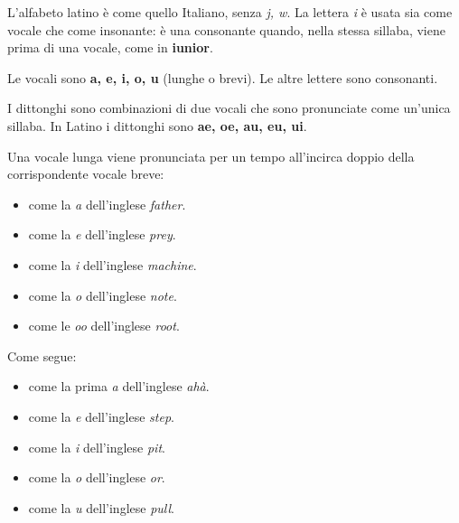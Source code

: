 \documentclass[nols]{tufte-handout}
\newcommand{\textls}[2][5]{%
    \begingroup\addfontfeatures{LetterSpace=#1}#2\endgroup
  }
\renewcommand{\smallcapsspacing}[1]{\textls[10]{#1}}
\renewcommand{\textsc}[1]{\smallcapsspacing{\textsmallcaps{#1}}}
\begin{document}
 L'alfabeto latino è come quello Italiano, senza \textit{j, w}. La lettera \textit{i} è usata sia come vocale che come insonante: è una consonante quando, nella stessa sillaba, viene prima di una vocale, come in \textbf{iunior}.

 Le vocali sono \textbf{a, e, i, o, u} (lunghe o brevi). Le altre lettere sono consonanti.

 I dittonghi sono combinazioni di due vocali che sono pronunciate come un'unica sillaba. In Latino i dittonghi sono \textbf{ae, oe, au, eu, ui}.

 Una vocale lunga viene pronunciata per un tempo all'incirca doppio della corrispondente vocale breve:
\begin{itemize}
\item[\textsc{ā}] come la \textit{a} dell'inglese \textit{father}.  
\item[\textsc{ē}] come la \textit{e} dell'inglese \textit{prey}. 
\item[\textsc{ī}] come la \textit{i} dell'inglese \textit{machine}.  
\item[\textsc{ō}] come la \textit{o} dell'inglese \textit{note}.  
\item[\textsc{ū}] come le \textit{oo} dell'inglese \textit{root}.  
\end{itemize}

 Come segue:
\begin{itemize}
\item[\textsc{ă}] come la prima \textit{a} dell'inglese \textit{ahà}.  
\item[\textsc{ĕ}] come la \textit{e} dell'inglese \textit{step}. 
\item[\textsc{ĭ}] come la \textit{i} dell'inglese \textit{pit}.  
\item[\textsc{ŏ}] come la \textit{o} dell'inglese \textit{or}.  
\item[\textsc{ŭ}] come la \textit{u} dell'inglese \textit{pull}.  
\end{itemize} 
\end{document}
